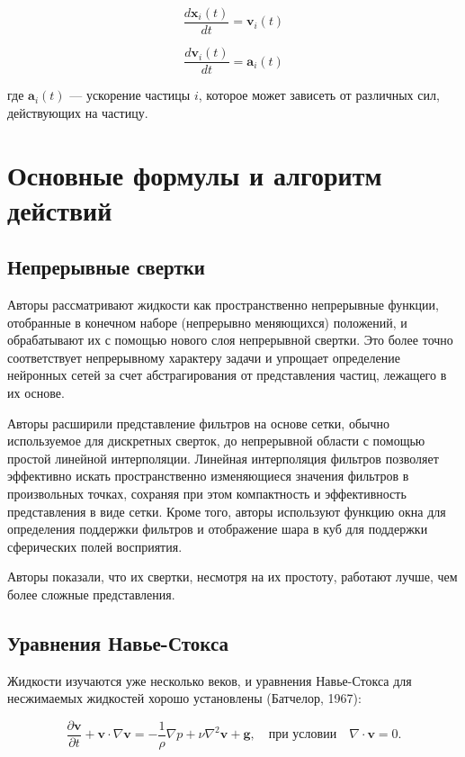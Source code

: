 \documentclass[a4paper,12pt]{article}
\theoremstyle{plain} %
\theoremstyle{definition} %
\theoremstyle{remark} %
\begin{document}
\begin{equation}
\frac{d\mathbf{x}_i(t)}{dt} = \mathbf{v}_i(t)
\end{equation}

\begin{equation}
\frac{d\mathbf{v}_i(t)}{dt} = \mathbf{a}_i(t)
\end{equation}

где $\mathbf{a}_i(t)$ — ускорение частицы $i$, которое может зависеть от различных сил, действующих на частицу.

\section{Основные формулы и алгоритм действий}
\subsection{Непрерывные свертки}

Авторы рассматривают жидкости как пространственно непрерывные функции, отобранные в конечном наборе (непрерывно меняющихся) положений, и обрабатывают их с помощью нового слоя непрерывной свертки. Это более точно соответствует непрерывному характеру задачи и упрощает определение нейронных сетей за счет абстрагирования от представления частиц, лежащего в их основе.

Авторы расширили представление фильтров на основе сетки, обычно используемое для дискретных сверток, до непрерывной области с помощью простой линейной интерполяции. Линейная интерполяция фильтров позволяет эффективно искать пространственно изменяющиеся значения фильтров в произвольных точках, сохраняя при этом компактность и эффективность представления в виде сетки. Кроме того, авторы используют функцию окна для определения поддержки фильтров и отображение шара в куб для поддержки сферических полей восприятия.

Авторы показали, что их свертки, несмотря на их простоту, работают лучше, чем более сложные представления.
\subsection{Уравнения Навье-Стокса}
Жидкости изучаются уже несколько веков, и уравнения Навье-Стокса для несжимаемых жидкостей хорошо установлены (Батчелор, 1967):

\begin{equation}
\frac{\partial \mathbf{v}}{\partial t} + \mathbf{v} \cdot \nabla \mathbf{v} = -\frac{1}{\rho} \nabla p + \nu \nabla^2 \mathbf{v} + \mathbf{g}, \quad \text{при условии} \quad \nabla \cdot \mathbf{v} = 0.
\end{equation}
\end{document}

